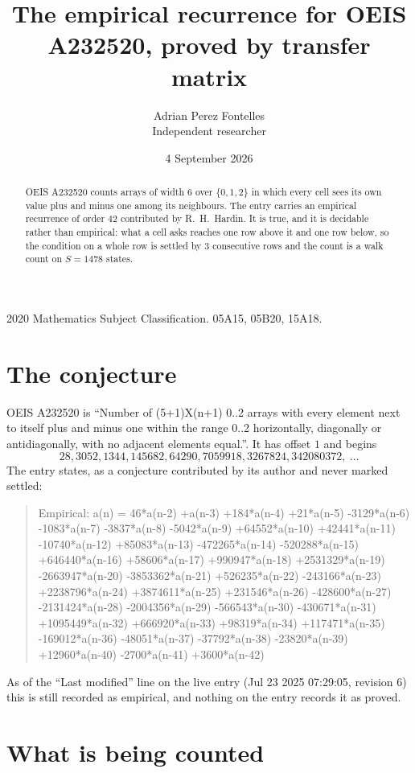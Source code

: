 \documentclass[11pt,a4paper]{article}
\title{The empirical recurrence for OEIS A232520, proved by transfer matrix}
\author{Adrian Perez Fontelles\\ \small Independent researcher}
\date{4 September 2026}
\theoremstyle{plain}
\theoremstyle{definition}
\begin{document}
\maketitle

\begin{abstract}
OEIS A232520 counts arrays of width $6$ over $\{0,1,2\}$ in which every cell sees its own value plus and minus one among its neighbours. The entry carries an
empirical recurrence of order $42$ contributed by R.~H.~Hardin. It is true, and it is
decidable rather than empirical: what a cell asks reaches one row above it and one row below, so the
condition on a whole row is settled by $3$ consecutive rows and the count is a walk
count on $S=1478$ states.
\end{abstract}

\noindent\small 2020 Mathematics Subject Classification. 05A15, 05B20, 15A18.\normalsize

\section{The conjecture}

OEIS A232520 is ``Number of (5+1)X(n+1) 0..2 arrays with every element next to itself plus and minus one within the range 0..2 horizontally, diagonally or antidiagonally, with no adjacent elements equal.''. It has offset $1$ and begins
\[
28, 3052, 1344, 145682, 64290, 7059918, 3267824, 342080372,\ \dots
\]
The entry states, as a conjecture contributed by its author and never marked settled:
\begin{quote}
Empirical: a(n) = 46*a(n-2) +a(n-3) +184*a(n-4) +21*a(n-5) -3129*a(n-6) -1083*a(n-7) -3837*a(n-8) -5042*a(n-9) +64552*a(n-10) +42441*a(n-11) -10740*a(n-12) +85083*a(n-13) -472265*a(n-14) -520288*a(n-15) +646440*a(n-16) +58606*a(n-17) +990947*a(n-18) +2531329*a(n-19) -2663947*a(n-20) -3853362*a(n-21) +526235*a(n-22) -243166*a(n-23) +2238796*a(n-24) +3874611*a(n-25) +231546*a(n-26) -428600*a(n-27) -2131424*a(n-28) -2004356*a(n-29) -566543*a(n-30) -430671*a(n-31) +1095449*a(n-32) +666920*a(n-33) +98319*a(n-34) +117471*a(n-35) -169012*a(n-36) -48051*a(n-37) -37792*a(n-38) -23820*a(n-39) +12960*a(n-40) -2700*a(n-41) +3600*a(n-42)
\end{quote}
As of the ``Last modified'' line on the live entry (Jul 23 2025 07:29:05, revision 6) this is still
recorded as empirical, and nothing on the entry records it as proved.

\section{What is being counted}
\end{document}
